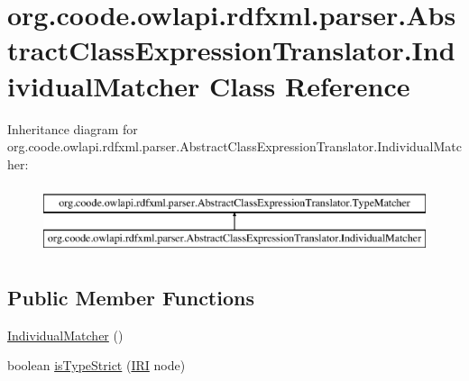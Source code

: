 \hypertarget{classorg_1_1coode_1_1owlapi_1_1rdfxml_1_1parser_1_1_abstract_class_expression_translator_1_1_individual_matcher}{\section{org.\-coode.\-owlapi.\-rdfxml.\-parser.\-Abstract\-Class\-Expression\-Translator.\-Individual\-Matcher Class Reference}
\label{classorg_1_1coode_1_1owlapi_1_1rdfxml_1_1parser_1_1_abstract_class_expression_translator_1_1_individual_matcher}
}
Inheritance diagram for org.\-coode.\-owlapi.\-rdfxml.\-parser.\-Abstract\-Class\-Expression\-Translator.\-Individual\-Matcher\-:\begin{figure}[H]
\begin{center}
\leavevmode
\includegraphics[height=2.000000cm]{classorg_1_1coode_1_1owlapi_1_1rdfxml_1_1parser_1_1_abstract_class_expression_translator_1_1_individual_matcher}
\end{center}
\end{figure}
\subsection*{Public Member Functions}
\begin{DoxyCompactItemize}
\item 
\hyperlink{classorg_1_1coode_1_1owlapi_1_1rdfxml_1_1parser_1_1_abstract_class_expression_translator_1_1_individual_matcher_ac9b6764313fb21268c135d34d96dedca}{Individual\-Matcher} ()
\item 
boolean \hyperlink{classorg_1_1coode_1_1owlapi_1_1rdfxml_1_1parser_1_1_abstract_class_expression_translator_1_1_individual_matcher_a53eef098149800828b5df1d5b9327828}{is\-Type\-Strict} (\hyperlink{classorg_1_1semanticweb_1_1owlapi_1_1model_1_1_i_r_i}{I\-R\-I} node)
\end{DoxyCompactItemize}


